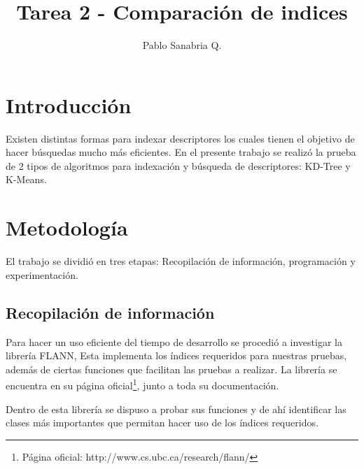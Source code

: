 \documentclass{article}
\title{Tarea 2 - Comparación de indices}
\author{Pablo Sanabria Q.}
\begin{document}
	\maketitle
	
	\section{Introducción}
	Existen distintas formas para indexar descriptores los cuales
	tienen el objetivo de hacer búsquedas mucho más eficientes.
	En el presente trabajo se realizó la prueba de 2 tipos de algoritmos para indexación y búsqueda de descriptores: KD-Tree y K-Means.
	\section{Metodología}
	El trabajo se dividió en tres etapas: Recopilación de información, programación y experimentación.
	\subsection{Recopilación de información}
	Para hacer un uso eficiente del tiempo de desarrollo se procedió a investigar la librería FLANN, Esta implementa los índices requeridos para nuestras pruebas, además de ciertas funciones que facilitan las pruebas a realizar.	La librería se encuentra en su página oficial\footnote{Página oficial: http://www.cs.ubc.ca/research/flann/}, junto a toda su documentación.
	
	Dentro de esta librería se dispuso a probar sus funciones y de ahí identificar las clases más importantes que permitan hacer uso de los índices requeridos.
\end{document}
